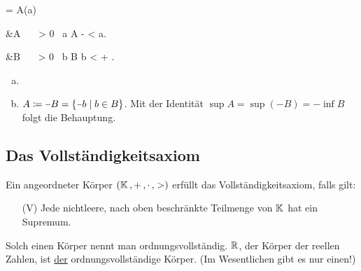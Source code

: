 \documentclass[../ana1.tex]{subfiles}
\begin{document}
\begin{lem}\label{satz:epskrit_inf_sup}\leavevmode
		\begin{alignenum}{\alpha = \sup A}{(a)}
			\begin{aitem}
				 &\iff \alpha \geq A  \, \wedge  \, \forall \, \varepsilon > 0  \, \exists a \in A \colon \; \alpha - \varepsilon < a.
			\end{aitem}\begin{aitem}
				 &\iff \beta  \leq B  \, \wedge  \, \forall \, \varepsilon > 0  \, \exists b \in B \colon \; b < \beta + \varepsilon.
			\end{aitem}
		\end{alignenum}
\end{lem}
\begin{bew}\leavevmode
	\begin{enumerate}[(a)]
		\item {}
		\item \(A \coloneqq \minus B = \set{\minus b  \;\vert  \;b \in B} \). Mit der Identität
			  \(\sup A = \sup(\minus B) = \minus \inf B \) folgt die Behauptung.\qedhere
	\end{enumerate}
\end{bew}


\subsection{Das Vollständigkeitsaxiom}

\begin{defi}
	Ein angeordneter Körper \((\mathbb{K} \operatorname{,} + \operatorname{,} \cdot \operatorname{,} >) \) erfüllt das Voll\-ständig\-keits\-axiom, falls gilt:
	\begin{enumerate}
		\item[(V)]\label{ax:V}Jede nichtleere, nach oben beschränkte Teilmenge von \(\mathbb{K} \) hat ein Supremum.
	\end{enumerate}
	Solch einen Körper nennt man ordnungsvollständig. \(\mathbb{R} \), der Körper der reellen Zahlen, ist \underline{der} ordnungsvollständige Körper. (Im Wesentlichen gibt es nur einen!)
\end{defi}
\end{document}
